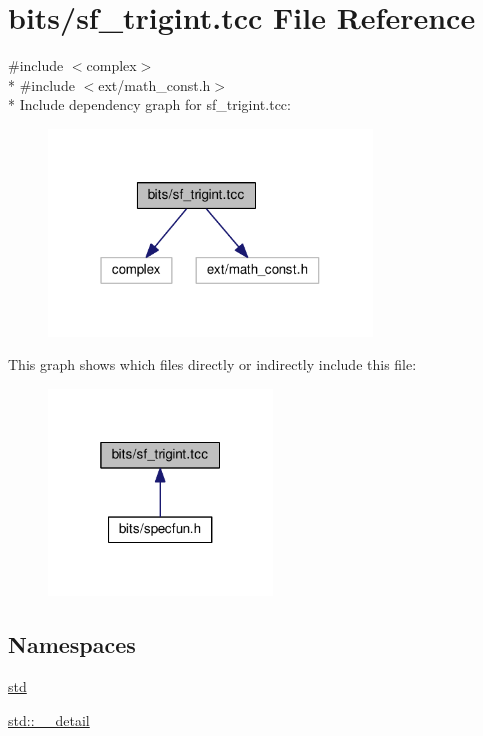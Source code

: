 \hypertarget{sf__trigint_8tcc}{}\section{bits/sf\+\_\+trigint.tcc File Reference}
\label{sf__trigint_8tcc}
{\ttfamily \#include $<$complex$>$}\\*
{\ttfamily \#include $<$ext/math\+\_\+const.\+h$>$}\\*
Include dependency graph for sf\+\_\+trigint.\+tcc\+:
\nopagebreak
\begin{figure}[H]
\begin{center}
\leavevmode
\includegraphics[width=244pt]{sf__trigint_8tcc__incl}
\end{center}
\end{figure}
This graph shows which files directly or indirectly include this file\+:
\nopagebreak
\begin{figure}[H]
\begin{center}
\leavevmode
\includegraphics[width=169pt]{sf__trigint_8tcc__dep__incl}
\end{center}
\end{figure}
\subsection*{Namespaces}
\begin{DoxyCompactItemize}
\item 
 \hyperlink{namespacestd}{std}
\item 
 \hyperlink{namespacestd_1_1____detail}{std\+::\+\_\+\+\_\+detail}
\end{DoxyCompactItemize}
